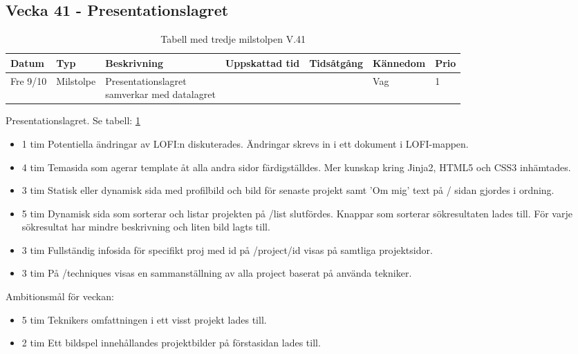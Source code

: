 \documentclass{TDP003mall}
\begin{document}
  
  \subsection*{Vecka 41 - Presentationslagret}
  \begin{table}[h!]
          \caption{Tabell med tredje milstolpen V.41\label{tab:6}}            
  \begin{tabularx}{\linewidth}{|l|l|X|l|l|l|l|}
  \hline
  Datum          & Typ       & Beskrivning                                                  & Uppskattad tid & Tidsåtgång & Kännedom & Prio \\ [0.5ex]
  \hline                                             
        Fre 9/10 & Milstolpe & \makecell[tl]{Presentationslagret \\samverkar med datalagret} &                &            & Vag      & 1 \\
    \hline
  \end{tabularx}
        \end{table}
        
Presentationslagret. Se tabell: \ref{tab:6}
\begin{itemize}
  \item 1 tim Potentiella ändringar av LOFI:n diskuterades. Ändringar skrevs in i ett dokument i LOFI-mappen.
  \item 4 tim Temasida som agerar template åt alla andra sidor färdigställdes. Mer kunskap kring Jinja2, HTML5 och CSS3 inhämtades.
  \item 3 tim Statisk eller dynamisk sida med profilbild och bild för senaste projekt samt 'Om mig' text på / sidan gjordes i ordning.
  \item 5 tim Dynamisk sida som sorterar och listar projekten på /list slutfördes. Knappar som sorterar sökresultaten lades till. För varje sökresultat har mindre beskrivning och liten bild lagts till.                  
  \item 3 tim Fullständig infosida för specifikt proj med id på /project/id visas på samtliga projektsidor.
  \item 3 tim På /techniques visas en sammanställning av alla project baserat på använda tekniker.
\end{itemize}

Ambitionsmål för veckan:
\begin{itemize}
\item 5 tim Teknikers omfattningen i ett visst projekt lades till.
\item 2 tim Ett bildspel innehållandes projektbilder på förstasidan lades till.
\end{itemize}
\end{document}
